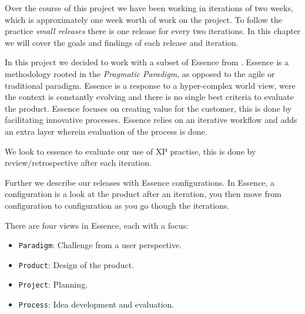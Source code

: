 Over the course of this project we have been working in iterations of two weeks, which is approximately one week worth of work on the project. To follow the practice \textit{small releases} there is one release for every two iterations. In this chapter we will cover the goals and findings of each release and iteration.

In this project we decided to work with a subset of Essence from \citet{essence:config}. Essence is a methodology rooted in the \textit{Pragmatic Paradigm}, as opposed to the agile or traditional paradigm. Essence is a response to a hyper-complex world view, were the context is constantly evolving and there is no single best criteria to evaluate the product. Essence focuses on creating value for the customer, this is done by facilitating innovative processes. Essence relies on an iterative workflow and adds an extra layer wherein evaluation of the process is done. 

We look to essence to evaluate our use of XP practise, this is done by review/retrospective after each iteration.

Further we describe our releases with Essence configurations. In Essence, a configuration is a look at the product after an iteration, you then move from configuration to configuration as you go though the iterations. 

There are four views in Essence, each with a focus: 
\begin{itemize}
\item \texttt{Paradigm}: Challenge from a user perspective.
\item \texttt{Product}: Design of the product.
\item \texttt{Project}: Planning.
\item \texttt{Process}: Idea development and evaluation.
\end{itemize}



